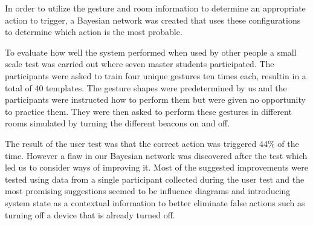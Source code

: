 In order to utilize the gesture and room information to determine an appropriate action to trigger, a Bayesian network was created that uses these configurations to determine which action is the most probable.

To evaluate how well the system performed when used by other people a small scale test was carried out where seven master students participated.
The participants were asked to train four unique gestures ten times each, resultin in a total of 40 templates.
The gesture shapes were predetermined by us and the participants were instructed how to perform them but were given no opportunity to practice them.
They were then asked to perform these gestures in different rooms simulated by turning the different beacons on and off.

The result of the user test was that the correct action was triggered 44\% of the time.
However a flaw in our Bayesian network was discovered after the test which led us to consider ways of improving it.
Most of the suggested improvements were tested using data from a single participant collected during the user test and the most promising suggestions seemed to be influence diagrams and introducing system state as a contextual information to better eliminate false actions such as turning off a device that is already turned off.